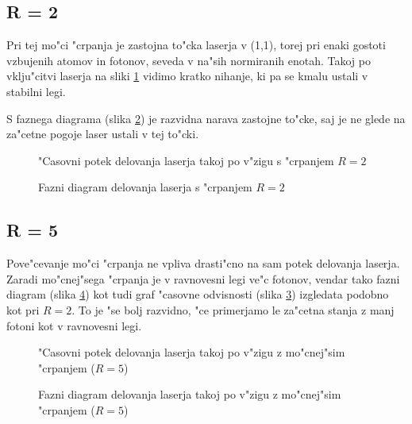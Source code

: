 \documentclass[a4paper,10pt]{article}
\begin{document}
\subsection{R = 2}

Pri tej mo"ci "crpanja je zastojna to"cka laserja v (1,1), torej pri enaki gostoti vzbujenih atomov in fotonov, seveda v na"sih normiranih enotah. Takoj po vklju"citvi laserja na sliki \ref{fig:laser-t-2} vidimo kratko nihanje, ki pa se kmalu ustali v stabilni legi. 

S faznega diagrama (slika \ref{fig:laser-p-2}) je razvidna narava zastojne to"cke, saj je ne glede na za"cetne pogoje laser ustali v tej to"cki. 

\begin{figure}[!h]
  
  \caption{"Casovni potek delovanja laserja takoj po v"zigu s "crpanjem $R=2$}
  \label{fig:laser-t-2}
\end{figure}

\begin{figure}[!h]
  
  \caption{Fazni diagram delovanja laserja s "crpanjem $R=2$}
  \label{fig:laser-p-2}
\end{figure}

\newpage
\subsection{R = 5}

Pove"cevanje mo"ci "crpanja ne vpliva drasti"cno na sam potek delovanja laserja. Zaradi mo"cnej"sega "crpanja je v ravnovesni legi ve"c fotonov, vendar tako fazni diagram (slika \ref{fig:laser-p-5}) kot tudi graf "casovne odvisnosti (slika \ref{fig:laser-t-5}) izgledata podobno kot pri $R=2$. To je "se bolj razvidno, "ce primerjamo le za"cetna stanja z manj fotoni kot v ravnovesni legi. 

\begin{figure}[!h]
  
  \caption{"Casovni potek delovanja laserja takoj po v"zigu z mo"cnej"sim "crpanjem ($R=5$)}
  \label{fig:laser-t-5}
\end{figure}

\begin{figure}[!h]
  
  \caption{Fazni diagram delovanja laserja takoj po v"zigu z mo"cnej"sim "crpanjem ($R=5$)}
  \label{fig:laser-p-5}
\end{figure}
\end{document}
